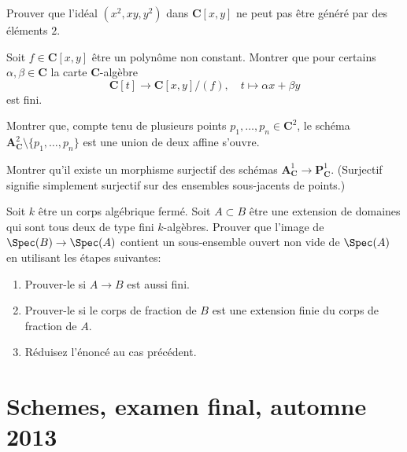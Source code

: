 \begin{exercise}
\label{exercise-not-complete-intersection}
Prouver que l'idéal $(x^2, xy, y^2)$ dans $\mathbf{C}[x, y]$ ne peut
pas être généré par des éléments $2$.
\end{exercise}

\begin{exercise}
\label{exercise-finite-projection}
Soit $f \in \mathbf{C}[x, y]$ être un polynôme non
constant. Montrer que pour certains $\alpha, \beta \in
\mathbf{C}$ la carte $\mathbf{C}$-algèbre
$$
\mathbf{C}[t] \longrightarrow \mathbf{C}[x, y]/(f),\quad
t \longmapsto \alpha x + \beta y
$$
est fini.
\end{exercise}

\begin{exercise}
\label{exercise-union-of-two-affines}
Montrer que, compte tenu de plusieurs points $p_1, \ldots, p_n \in
\mathbf{C}^2$, le schéma $\mathbf{A}^2_\mathbf{C} \setminus \{p_1, \ldots, p_n\}$ est une
union de deux affine s'ouvre.
\end{exercise}

\begin{exercise}
\label{exercise-surjection-A1-P1}
Montrer qu'il existe un morphisme surjectif des
schémas $\mathbf{A}^1_\mathbf{C} \to \mathbf{P}^1_\mathbf{C}$. (Surjectif signifie
simplement surjectif sur des ensembles sous-jacents de points.)
\end{exercise}

\begin{exercise}
\label{exercise-almost-surjective}
Soit $k$ être un corps algébrique fermé. Soit $A \subset B$ être
une extension de domaines qui sont tous deux de type fini
$k$-algèbres. Prouver que l'image de $\Spec(B) \to \Spec(A)$
contient un sous-ensemble ouvert non vide de $\Spec(A)$ en utilisant les étapes suivantes:
\begin{enumerate}
\item Prouver-le si $A \to B$ est aussi fini.
\item Prouver-le si le corps de fraction de $B$ est une extension finie
du corps de fraction de $A$.
\item Réduisez l'énoncé au cas précédent.
\end{enumerate}
\end{exercise}





\section{Schemes, examen final, automne 2013}
\label{section-final-exam-fall-2013}

